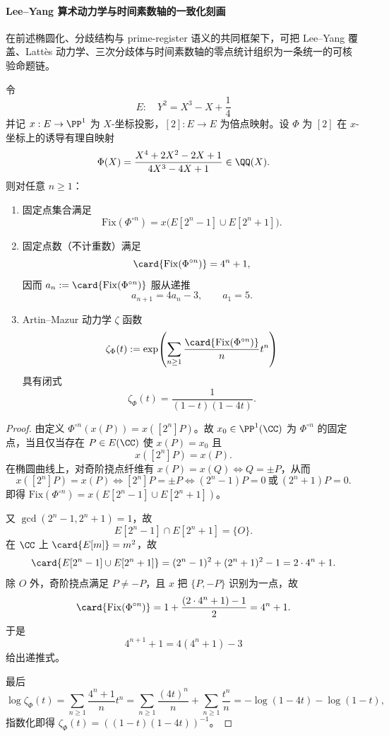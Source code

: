 \paragraph{Lee--Yang 算术动力学与时间素数轴的一致化刻画}
在前述椭圆化、分歧结构与 prime-register 语义的共同框架下，可把 Lee--Yang 覆盖、Latt\`es 动力学、三次分歧体与时间素数轴的零点统计组织为一条统一的可核验命题链。

\begin{theorem}\label{thm:xi-time-part9c-leyang-lattes-fix-zeta}
令
\[
E:\quad Y^2=X^3-X+\frac14
\]
并记 \(x:E\to\PP^1\) 为 \(X\)-坐标投影，\([2]:E\to E\) 为倍点映射。设 \(\Phi\) 为 \([2]\) 在 \(x\)-坐标上的诱导有理自映射
\[
\Phi(X)=\frac{X^4+2X^2-2X+1}{4X^3-4X+1}\in\QQ(X).
\]
则对任意 \(n\ge 1\)：
\begin{enumerate}
  \item 固定点集合满足
  \[
  \mathrm{Fix}(\Phi^{\circ n})
  =x\!\bigl(E[2^n-1]\cup E[2^n+1]\bigr).
  \]
  \item 固定点数（不计重数）满足
  \[
  \card{\mathrm{Fix}(\Phi^{\circ n})}=4^n+1,
  \]
  因而 \(a_n:=\card{\mathrm{Fix}(\Phi^{\circ n})}\) 服从递推
  \[
  a_{n+1}=4a_n-3,\qquad a_1=5.
  \]
  \item Artin--Mazur 动力学 \(\zeta\) 函数
  \[
  \zeta_\Phi(t):=\exp\!\left(\sum_{n\ge 1}\frac{\card{\mathrm{Fix}(\Phi^{\circ n})}}{n}t^n\right)
  \]
  具有闭式
  \[
  \zeta_\Phi(t)=\frac{1}{(1-t)(1-4t)}.
  \]
\end{enumerate}
\end{theorem}
\begin{proof}
由定义 \(\Phi^{\circ n}(x(P))=x([2^n]P)\)。故 \(x_0\in\PP^1(\CC)\) 为 \(\Phi^{\circ n}\) 的固定点，当且仅当存在 \(P\in E(\CC)\) 使 \(x(P)=x_0\) 且
\[
x([2^n]P)=x(P).
\]
在椭圆曲线上，对奇阶挠点纤维有 \(x(P)=x(Q)\iff Q=\pm P\)，从而
\[
x([2^n]P)=x(P)
\iff [2^n]P=\pm P
\iff (2^n-1)P=0\ \text{或}\ (2^n+1)P=0.
\]
即得
\(
\mathrm{Fix}(\Phi^{\circ n})=x(E[2^n-1]\cup E[2^n+1])
\)。

又 \(\gcd(2^n-1,2^n+1)=1\)，故
\[
E[2^n-1]\cap E[2^n+1]=\{O\}.
\]
在 \(\CC\) 上 \(\card{E[m]}=m^2\)，故
\[
\card{E[2^n-1]\cup E[2^n+1]}
=(2^n-1)^2+(2^n+1)^2-1
=2\cdot 4^n+1.
\]
除 \(O\) 外，奇阶挠点满足 \(P\neq -P\)，且 \(x\) 把 \(\{P,-P\}\) 识别为一点，故
\[
\card{\mathrm{Fix}(\Phi^{\circ n})}
=1+\frac{(2\cdot 4^n+1)-1}{2}
=4^n+1.
\]
于是
\[
4^{n+1}+1=4(4^n+1)-3
\]
给出递推式。

最后
\[
\log\zeta_\Phi(t)
=\sum_{n\ge 1}\frac{4^n+1}{n}t^n
=\sum_{n\ge 1}\frac{(4t)^n}{n}+\sum_{n\ge 1}\frac{t^n}{n}
=-\log(1-4t)-\log(1-t),
\]
指数化即得
\(
\zeta_\Phi(t)=((1-t)(1-4t))^{-1}
\)。
\end{proof}

